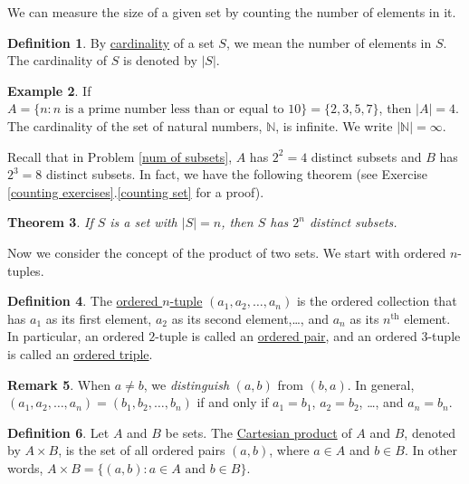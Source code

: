 \documentclass[12pt,letterpaper]{book}
\numberwithin{equation}{section}
\newtheorem{thm}{\textbf{Theorem}}[section]
\theoremstyle{definition}
\newtheorem{defi}[thm]{\textbf{Definition}}
\newtheorem{example}[thm]{\textbf{Example}}
\newtheorem{remark}[thm]{\textbf{Remark}}
\begin{document}
We can measure the size of a given set by counting the number of elements in it.

\begin{defi} By \underline{cardinality} of a set $S$, we mean the number of elements in $S$. The cardinality of $S$ is denoted by $|S|$.
\end{defi}

\begin{example} If $A=\{n: n\text{ is a prime number less than or equal to }10\}=\{2,3,5,7\}$, then $|A|=4$. The cardinality of the set of natural numbers, $\mathbb{N}$, is infinite. We write $|\mathbb{N}|=\infty$.
\end{example}

Recall that in Problem \ref{num of subsets}, $A$ has $2^2=4$ distinct subsets and $B$ has $2^3=8$ distinct subsets. In fact, we have the following theorem (see Exercise \ref{counting exercises}.\ref{counting set} for a proof).

\begin{thm}\label{powerset} If $S$ is a set with $|S|=n$, then $S$ has $2^n$ distinct subsets.
\end{thm}

Now we consider the concept of the product of two sets. We start with ordered $n$-tuples.

\begin{defi} The \underline{ordered $n$-tuple} $(a_1,a_2,\ldots,a_n)$ is the ordered collection that has $a_1$ as its first element, $a_2$ as its second element,\ldots, and $a_n$ as its $n^\text{th}$ element. In particular, an ordered $2$-tuple is called an \underline{ordered pair}, and an ordered $3$-tuple is called an \underline{ordered triple}.
\end{defi}

\begin{remark} When $a\neq b$, we \textit{distinguish} $(a,b)$ from $(b,a)$. In general, $(a_1,a_2,\ldots, a_n) = (b_1,b_2,\ldots, b_n)$ if and only if $a_1=b_1$, $a_2=b_2$, \ldots, and $a_n=b_n$.
\end{remark}

\begin{defi} Let $A$ and $B$ be sets. The \underline{Cartesian product} of $A$ and $B$, denoted by $A\times B$, is the set of all ordered pairs $(a,b)$, where $a\in A$ and $b\in B$. In other words, $A\times B=\{(a,b): a\in A \text{ and } b\in B\}$.
\end{defi}
\end{document}
